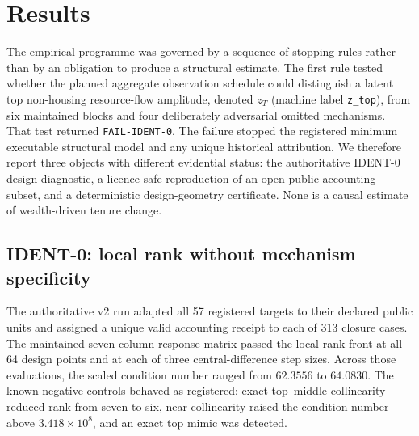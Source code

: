 \providecommand{\artifactdigest}[8]{{\footnotesize\ttfamily
  #1\allowbreak{}#2\allowbreak{}#3\allowbreak{}#4\allowbreak{}%
  #5\allowbreak{}#6\allowbreak{}#7\allowbreak{}#8}}
\providecommand{\commitdigest}[5]{{\ttfamily
  #1\allowbreak{}#2\allowbreak{}#3\allowbreak{}#4\allowbreak{}#5}}

\section{Results}
\label{sec:results}

The empirical programme was governed by a sequence of stopping rules rather
than by an obligation to produce a structural estimate.  The first rule tested
whether the planned aggregate observation schedule could distinguish a latent
top non-housing resource-flow amplitude, denoted $z_T$ (machine label
\texttt{z\_top}), from six
maintained blocks and four deliberately adversarial omitted mechanisms.  That
test returned \texttt{FAIL-IDENT-0}.  The failure stopped the registered
minimum executable structural model and any unique historical attribution.
We therefore report three objects with different evidential status: the
authoritative IDENT-0 design diagnostic, a licence-safe reproduction of an
open public-accounting subset, and a deterministic design-geometry
certificate.  None is a causal estimate of wealth-driven tenure change.

\subsection{IDENT-0: local rank without mechanism specificity}
\label{sec:ident0-results}

The authoritative v2 run adapted all 57 registered targets to their declared
public units and assigned a unique valid accounting receipt to each of 313
closure cases.  The maintained seven-column response matrix passed the local
rank front at all 64 design points and at each of three central-difference step
sizes.  Across those evaluations, the scaled condition number ranged from
$62.3556$ to $64.0830$.  The known-negative controls behaved as registered:
exact top--middle collinearity reduced rank from seven to six, near
collinearity raised the condition number above $3.418\times10^{8}$, and an
exact top mimic was detected.

